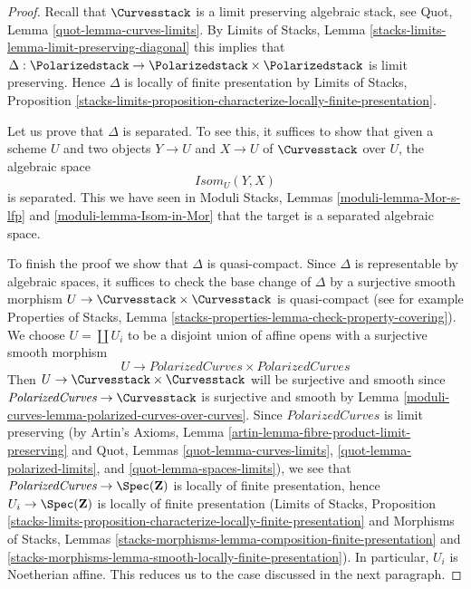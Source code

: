 \begin{proof}
Recall that $\Curvesstack$ is a limit preserving algebraic stack, see
Quot, Lemma \ref{quot-lemma-curves-limits}.
By Limits of Stacks, Lemma \ref{stacks-limits-lemma-limit-preserving-diagonal}
this implies that
$\Delta : \Polarizedstack \to \Polarizedstack \times \Polarizedstack$
is limit preserving. Hence $\Delta$ is locally of finite presentation
by Limits of Stacks, Proposition
\ref{stacks-limits-proposition-characterize-locally-finite-presentation}.

\medskip\noindent
Let us prove that $\Delta$ is separated. To see this, it suffices to show
that given a scheme $U$ and two objects $Y \to U$ and $X \to U$ of
$\Curvesstack$ over $U$, the algebraic space
$$
\mathit{Isom}_U(Y, X)
$$
is separated. This we have seen in
Moduli Stacks, Lemmas \ref{moduli-lemma-Mor-s-lfp} and
\ref{moduli-lemma-Isom-in-Mor} that the target is
a separated algebraic space.

\medskip\noindent
To finish the proof we show that $\Delta$ is quasi-compact. Since
$\Delta$ is representable by algebraic spaces, it suffices to check
the base change of $\Delta$ by a surjective smooth morphism
$U \to \Curvesstack \times \Curvesstack$ is quasi-compact
(see for example Properties of Stacks, Lemma
\ref{stacks-properties-lemma-check-property-covering}).
We choose $U = \coprod U_i$ to be a disjoint union of affine opens
with a surjective smooth morphism
$$
U \longrightarrow
\textit{PolarizedCurves} \times \textit{PolarizedCurves}
$$
Then $U \to \Curvesstack \times \Curvesstack$ will be surjective
and smooth since $\textit{PolarizedCurves} \to \Curvesstack$
is surjective and smooth by Lemma \ref{moduli-curves-lemma-polarized-curves-over-curves}.
Since $\textit{PolarizedCurves}$ is limit preserving
(by Artin's Axioms, Lemma \ref{artin-lemma-fibre-product-limit-preserving}
and Quot, Lemmas \ref{quot-lemma-curves-limits},
\ref{quot-lemma-polarized-limits}, and
\ref{quot-lemma-spaces-limits}), we
see that $\textit{PolarizedCurves} \to \Spec(\mathbf{Z})$ is locally of
finite presentation, hence $U_i \to \Spec(\mathbf{Z})$ is
locally of finite presentation
(Limits of Stacks, Proposition
\ref{stacks-limits-proposition-characterize-locally-finite-presentation}
and Morphisms of Stacks, Lemmas
\ref{stacks-morphisms-lemma-composition-finite-presentation} and
\ref{stacks-morphisms-lemma-smooth-locally-finite-presentation}).
In particular, $U_i$ is Noetherian affine. This reduces us to the
case discussed in the next paragraph.


\end{proof}
